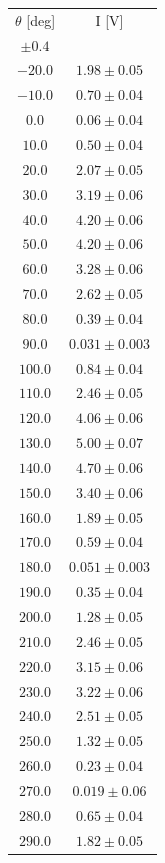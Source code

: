 \documentclass[10pt,oneside,a4paper]{article}
\begin{document}
\begin{table}[H]
\centering
{}
\label{tab:malus2}
\begin{tabular}{cc}
\hline
 $\theta$ [deg]& I [V]\\
 $\pm 0.4$ & \\
\hline
  $-20.0 $&$ 1.98 \pm 0.05$ \\
  $-10.0 $&$ 0.70 \pm 0.04$ \\
  $  0.0 $& $0.06  \pm0.04 $\\
  $ 10.0 $&$ 0.50 \pm 0.04$ \\
  $  20.0$ &$ 2.07 \pm 0.05$ \\
  $ 30.0 $&$ 3.19 \pm 0.06$ \\
  $ 40.0 $&$ 4.20 \pm 0.06$ \\
  $ 50.0 $&$ 4.20 \pm 0.06$ \\
  $ 60.0 $&$ 3.28 \pm 0.06$ \\
  $ 70.0 $&$ 2.62 \pm 0.05$ \\
  $ 80.0 $&$ 0.39 \pm 0.04$ \\
  $ 90.0 $&$ 0.031 \pm 0.003$ \\
  $100.0$ &$ 0.84 \pm 0.04$ \\
  $110.0$ &$ 2.46 \pm 0.05$ \\
  $120.0$ &$ 4.06 \pm 0.06$ \\
  $130.0$ &$ 5.00 \pm 0.07$ \\
  $140.0$ &$ 4.70 \pm 0.06$ \\
  $150.0$ &$ 3.40 \pm0.06$ \\
  $160.0$ &$ 1.89 \pm0.05$ \\
  $170.0$ &$ 0.59 \pm 0.04$ \\
  $180.0$ &$ 0.051 \pm 0.003$ \\
  $190.0$ &$ 0.35 \pm 0.04$ \\
  $200.0$ &$ 1.28 \pm 0.05$ \\
  $210.0$ &$ 2.46 \pm 0.05$ \\
  $220.0$ &$ 3.15 \pm 0.06$ \\
  $230.0$ &$ 3.22 \pm 0.06$ \\
  $240.0$ &$ 2.51 \pm 0.05$ \\
  $250.0$ &$ 1.32 \pm 0.05$ \\
  $260.0$ &$ 0.23 \pm 0.04$ \\
  $270.0$ &$ 0.019 \pm 0.06$ \\
  $280.0$ &$ 0.65 \pm 0.04$ \\
  $290.0$ &$ 1.82 \pm 0.05$ \\

\end{tabular}
\end{table}
\end{document}
